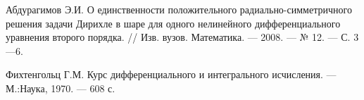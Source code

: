 \begin{thebibliography}{111}
Абдурагимов Э.И. О единственности положительного
радиально-симметричного решения задачи Дирихле в шаре для одного
нелинейного дифференциального уравнения второго порядка. // Изв.
вузов. Математика. --- 2008. --- № 12. --- С. 3---6.


Фихтенгольц Г.М. Курс дифференциального и интегрального исчисления.
--- М.:Наука, 1970. --- 608 с.










%
%
%
%
%
%
%
%
%
%
%
%
%
%
%
%
%
%
%
%

\end{thebibliography}
